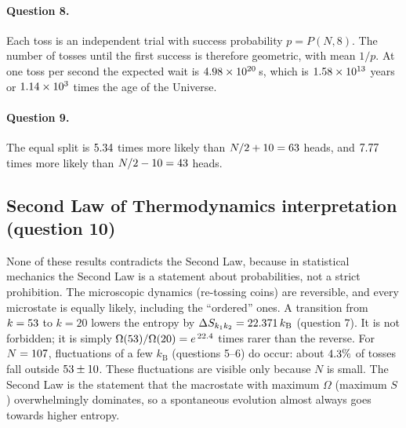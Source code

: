 \documentclass[11pt, a4paper]{article}
\newcommand{\kB}{k_{\mathrm{B}}}
\begin{document}
\paragraph{Question 8.}
Each toss is an independent trial with success probability $p=P(N,8)$. The number of tosses until the first success is therefore geometric, with mean $1/p$. At one toss per second the expected wait is $4.98\times10^{20}$\,s, which is $1.58\times10^{13}$ years or $1.14\times10^{3}$ times the age of the Universe.

\paragraph{Question 9.}
The equal split is $5.34$ times more likely than $N/2+10=63$ heads, and $7.77$ times more likely than $N/2-10=43$ heads.

\subsection{Second Law of Thermodynamics interpretation (question 10)}
None of these results contradicts the Second Law, because in statistical mechanics the Second Law is a statement about probabilities, not a strict prohibition. The microscopic dynamics (re-tossing coins) are reversible, and every microstate is equally likely, including the ``ordered'' ones. A transition from $k=53$ to $k=20$ lowers the entropy by $\Delta S_{k_1k_2}=\dSC\,\kB$ (question 7). It is not forbidden; it is simply $\Omega(53)/\Omega(20)=e^{\,22.4}$ times rarer than the reverse. For $N=107$, fluctuations of a few $\kB$ (questions 5--6) do occur: about $4.3\%$ of tosses fall outside $53\pm10$. These fluctuations are visible only because $N$ is small. The Second Law is the statement that the macrostate with maximum $\Omega$ (maximum $S$) overwhelmingly dominates, so a spontaneous evolution almost always goes towards higher entropy.
\end{document}
